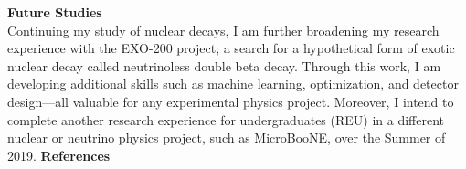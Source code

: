 \documentclass[12pt, letterpaper, twocolumn]{article}
\begin{document}
\vspace{0.125in}
\noindent\textbf{Future Studies}\\
Continuing my study of nuclear decays, I am further broadening my research experience with the EXO-200 project, a search for a hypothetical form of exotic nuclear decay called neutrinoless double beta decay. Through this work, I am developing additional skills such as machine learning, optimization, and detector design---all valuable for any experimental physics project. Moreover, I intend to complete another research experience for undergraduates (REU) in a different nuclear or neutrino physics project, such as MicroBooNE, over the Summer of 2019.
\newpage
\noindent\textbf{References}
\printbibliography[heading=none]
\end{document}
